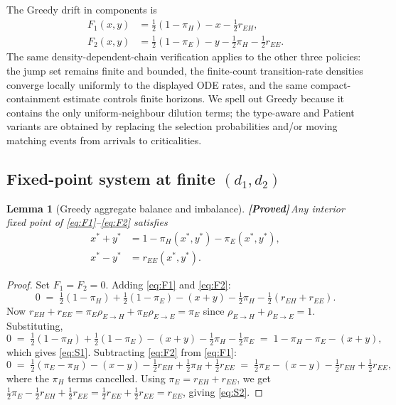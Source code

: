 \documentclass{article}
\theoremstyle{plain}
\newtheorem{lemma}{Lemma}
\theoremstyle{definition}
\newcommand{\proved}{\textcolor{provedgreen}{\textbf{[Proved]}}\,}
\begin{document}
The Greedy drift in components is
\begin{align}
F_1(x,y) &= \tfrac12(1-\pi_H)-x-\tfrac12 r_{EH},\label{eq:F1}\\
F_2(x,y) &= \tfrac12(1-\pi_E)-y-\tfrac12\pi_H-\tfrac12 r_{EE}.\label{eq:F2}
\end{align}
The same density-dependent-chain verification applies to the other three policies: the jump set remains finite and bounded, the finite-count transition-rate densities converge locally uniformly to the displayed ODE rates, and the same compact-containment estimate controls finite horizons. We spell out Greedy because it contains the only uniform-neighbour dilution terms; the type-aware and Patient variants are obtained by replacing the selection probabilities and/or moving matching events from arrivals to criticalities.

\subsection{Fixed-point system at finite $(d_1,d_2)$}\label{ssec:greedy-fp}

\begin{lemma}[Greedy aggregate balance and imbalance]\label{lem:greedy-aggreg}
\proved Any interior fixed point of \eqref{eq:F1}--\eqref{eq:F2} satisfies
\begin{align}
x^\ast+y^\ast &= 1-\pi_H(x^\ast,y^\ast)-\pi_E(x^\ast,y^\ast),\label{eq:S1}\\
x^\ast-y^\ast &= r_{EE}(x^\ast,y^\ast).\label{eq:S2}
\end{align}
\end{lemma}

\begin{proof}
Set $F_1=F_2=0$. Adding \eqref{eq:F1} and \eqref{eq:F2}:
\[
0\;=\;\tfrac12(1-\pi_H)+\tfrac12(1-\pi_E)-(x+y)-\tfrac12\pi_H-\tfrac12(r_{EH}+r_{EE}).
\]
Now $r_{EH}+r_{EE}=\pi_E\rho_{E\to H}+\pi_E\rho_{E\to E}=\pi_E$ since $\rho_{E\to H}+\rho_{E\to E}=1$. Substituting,
\[
0\;=\;\tfrac12(1-\pi_H)+\tfrac12(1-\pi_E)-(x+y)-\tfrac12\pi_H-\tfrac12\pi_E\;=\;1-\pi_H-\pi_E-(x+y),
\]
which gives \eqref{eq:S1}. Subtracting \eqref{eq:F2} from \eqref{eq:F1}:
\[
0\;=\;\tfrac12(\pi_E-\pi_H)-(x-y)-\tfrac12 r_{EH}+\tfrac12\pi_H+\tfrac12 r_{EE}\;=\;\tfrac12\pi_E-(x-y)-\tfrac12 r_{EH}+\tfrac12 r_{EE},
\]
where the $\pi_H$ terms cancelled. Using $\pi_E=r_{EH}+r_{EE}$, we get $\tfrac12\pi_E-\tfrac12 r_{EH}+\tfrac12 r_{EE}=\tfrac12 r_{EE}+\tfrac12 r_{EE}=r_{EE}$, giving \eqref{eq:S2}.
\end{proof}
\end{document}
